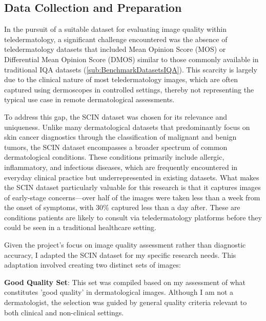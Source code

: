\subsection{Data Collection and Preparation}
\label{sub:DataCollection}
In the pursuit of a suitable dataset for evaluating image quality within teledermatology, a significant challenge encountered was the absence of teledermatology datasets that included Mean Opinion Score (MOS) or Differential Mean Opinion Score (DMOS) similar to those commonly available in traditional IQA datasets (\autoref{sub:BenchmarkDatasetsIQA}). This scarcity is largely due to the clinical nature of most teledermatology images, which are often captured using dermoscopes in controlled settings, thereby not representing the typical use case in remote dermatological assessments.\par
\vspace{\baselineskip}
\noindent
To address this gap, the SCIN dataset was chosen for its relevance and uniqueness. Unlike many dermatological datasets that predominantly focus on skin cancer diagnostics through the classification of malignant and benign tumors, the SCIN dataset encompasses a broader spectrum of common dermatological conditions. These conditions primarily include allergic, inflammatory, and infectious diseases, which are frequently encountered in everyday clinical practice but underrepresented in existing datasets. What makes the SCIN dataset particularly valuable for this research is that it captures images of early-stage concerns—over half of the images were taken less than a week from the onset of symptoms, with 30\% captured less than a day after. These are conditions patients are likely to consult via teledermatology platforms before they could be seen in a traditional healthcare setting.\par
\vspace{\baselineskip}
\noindent
Given the project's focus on image quality assessment rather than diagnostic accuracy, I adapted the SCIN dataset for my specific research needs. This adaptation involved creating two distinct sets of images:\par
\vspace{\baselineskip}
\noindent
\textbf{Good Quality Set}: This set was compiled based on my assessment of what constitutes 'good quality' in dermatological images. Although I am not a dermatologist, the selection was guided by general quality criteria relevant to both clinical and non-clinical settings. \par
\noindent
